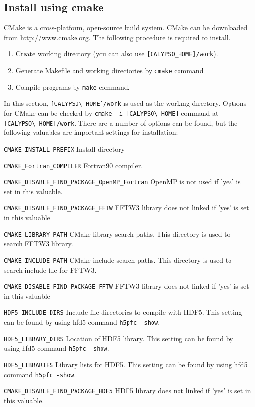 \subsection{Install using cmake}
CMake is a cross-platform, open-source build system. CMake can be downloaded from \url{http://www.cmake.org}. The following procedure is required to install.
%
\begin{enumerate}
\item Create working directory (you can also use \verb|[CALYPSO_HOME]/work|).
\item Generate Makefile and working directories by {\tt cmake} command.
\item Compile programs by {\tt make} command.
\end{enumerate}
%
In this section, \verb|[CALYPSO\_HOME]/work| is used as the working directory.
Options for CMake can be checked by \verb|cmake -i [CALYPSO\_HOME]| command at \verb|[CALYPSO\_HOME]/work|. There are a number of options can be found, but the following valuables are important settings for installation:
%
\begin{description}
\item{\verb|CMAKE_INSTALL_PREFIX|}  Install directory
\item{\verb|CMAKE_Fortran_COMPILER|} Fortran90 compiler.
\item{\verb|CMAKE_DISABLE_FIND_PACKAGE_OpenMP_Fortran|} OpenMP is not used if 'yes' is set in this valuable.

\item{\verb|CMAKE_DISABLE_FIND_PACKAGE_FFTW|}  FFTW3 library does not linked if 'yes' is set in this valuable.

\item{\verb|CMAKE_LIBRARY_PATH|}   CMake library  search paths. This directory is used to search FFTW3 library.
\item{\verb|CMAKE_INCLUDE_PATH|}   CMake include search paths. This directory is used to search include file for FFTW3.

\item{\verb|CMAKE_DISABLE_FIND_PACKAGE_FFTW|}  FFTW3 library does not linked if 'yes' is set in this valuable.

\item{\verb|HDF5_INCLUDE_DIRS|}  Include file directories to compile with HDF5. This setting can be found by using hfd5 command \verb|h5pfc -show|.
\item{\verb|HDF5_LIBRARY_DIRS|}    Location of HDF5 library. This setting can be found by using hfd5 command \verb|h5pfc -show|.
\item{\verb|HDF5_LIBRARIES|}   Library lists for HDF5. This setting can be found by using hfd5 command \verb|h5pfc -show|.
\item{\verb|CMAKE_DISABLE_FIND_PACKAGE_HDF5|}  HDF5 library does not linked if 'yes' is set in this valuable.
\end{description}
